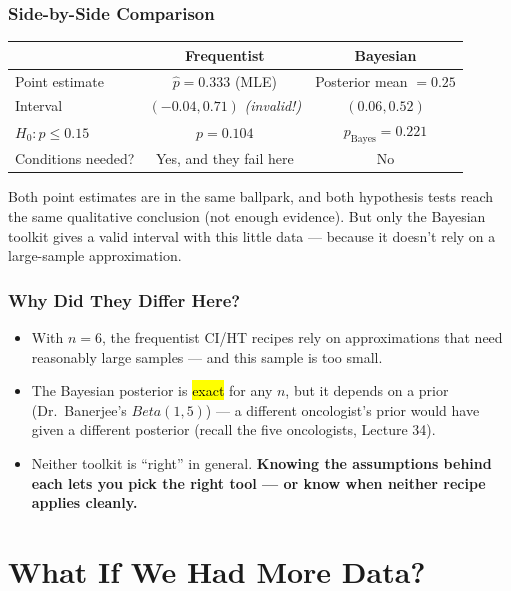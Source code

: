 \documentclass[slidestop,compress,mathserif]{beamer}
\begin{document}
\begin{frame}
    \frametitle{Side-by-Side Comparison}
    \begin{center}
    \renewcommand{\arraystretch}{1.3}
    \begin{tabular}{l c c}
    \toprule
     & \textbf{Frequentist} & \textbf{Bayesian} \\
    \midrule
    Point estimate & $\hat{p}=0.333$ (MLE) & Posterior mean $= 0.25$ \\
    Interval & $(-0.04, 0.71)$ \emph{(invalid!)} & $(0.06, 0.52)$ \\
    $H_0: p\le 0.15$ & $p=0.104$ & $p_{\text{Bayes}}=0.221$ \\
    Conditions needed? & Yes, and they fail here & No \\
    \bottomrule
    \end{tabular}
    \end{center}
    \pause

    \medskip
    Both point estimates are in the same ballpark, and both hypothesis tests reach the same qualitative conclusion (not enough evidence). But only the Bayesian toolkit gives a valid interval with this little data --- because it doesn't rely on a large-sample approximation.
\end{frame}

\begin{frame}
    \frametitle{Why Did They Differ Here?}
    \begin{itemize}
        \item With $n=6$, the frequentist CI/HT recipes rely on approximations that need reasonably large samples --- and this sample is too small.
        \pause
        \item The Bayesian posterior is \hl{exact} for any $n$, but it depends on a prior (Dr.\ Banerjee's $Beta(1,5)$) --- a different oncologist's prior would have given a different posterior (recall the five oncologists, Lecture 34).
        \pause
        \item Neither toolkit is ``right'' in general. \textbf{Knowing the assumptions behind each lets you pick the right tool --- or know when neither recipe applies cleanly.}
    \end{itemize}
\end{frame}


\section{What If We Had More Data?}
\end{document}
